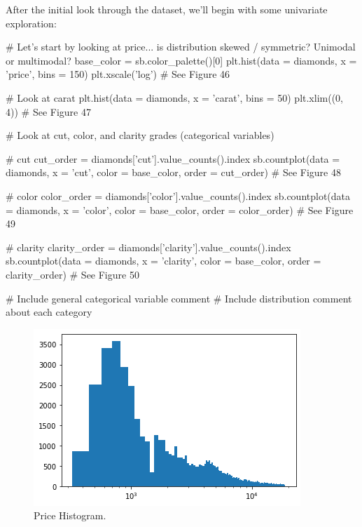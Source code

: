 \newpage
After the initial look through the dataset, we'll begin with some univariate exploration:
\begin{python}
	# Let's start by looking at price... is distribution skewed / symmetric? Unimodal or multimodal?
	base_color = sb.color_palette()[0]
	plt.hist(data = diamonds, x = 'price', bins = 150)
	plt.xscale('log')
	# See Figure 46
	
	# Look at carat
	plt.hist(data = diamonds, x = 'carat', bins = 50)
	plt.xlim((0, 4))
	# See Figure 47
	
	# Look at cut, color, and clarity grades (categorical variables)
	
	# cut
	cut_order = diamonds['cut'].value_counts().index
	sb.countplot(data = diamonds, x = 'cut', color = base_color, order = cut_order)
	# See Figure 48
	
	# color
	color_order = diamonds['color'].value_counts().index
	sb.countplot(data = diamonds, x = 'color', color = base_color, order = color_order)
	# See Figure 49
	
	# clarity
	clarity_order = diamonds['clarity'].value_counts().index
	sb.countplot(data = diamonds, x = 'clarity', color = base_color, order = clarity_order)
	# See Figure 50
	
	# Include general categorical variable comment
	# Include distribution comment about each category
\end{python}


\begin{figure}
	\includegraphics{images/figure46.png}
	\caption{Price Histogram.}\label{fig:figure46}
\end{figure}

